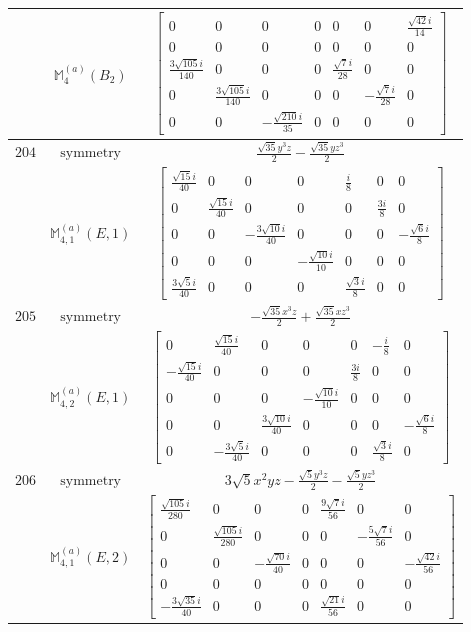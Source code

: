 \documentclass[fleqn,8pt,landscape]{jsarticle}
\begin{document}
\begin{longtable}{ccc}
$  $ & $ \mathbb{M}_{4}^{(a)}(B_{2}) $ & $ \begin{bmatrix} 0 & 0 & 0 & 0 & 0 & 0 & \frac{\sqrt{42} i}{14} \\ 0 & 0 & 0 & 0 & 0 & 0 & 0 \\ \frac{3 \sqrt{105} i}{140} & 0 & 0 & 0 & \frac{\sqrt{7} i}{28} & 0 & 0 \\ 0 & \frac{3 \sqrt{105} i}{140} & 0 & 0 & 0 & - \frac{\sqrt{7} i}{28} & 0 \\ 0 & 0 & - \frac{\sqrt{210} i}{35} & 0 & 0 & 0 & 0 \end{bmatrix} $ \\ \hline
$ 204 $ & $ \text{symmetry} $ & $ \frac{\sqrt{35} y^{3} z}{2} - \frac{\sqrt{35} y z^{3}}{2} $ \\
$  $ & $ \mathbb{M}_{4,1}^{(a)}(E,1) $ & $ \begin{bmatrix} \frac{\sqrt{15} i}{40} & 0 & 0 & 0 & \frac{i}{8} & 0 & 0 \\ 0 & \frac{\sqrt{15} i}{40} & 0 & 0 & 0 & \frac{3 i}{8} & 0 \\ 0 & 0 & - \frac{3 \sqrt{10} i}{40} & 0 & 0 & 0 & - \frac{\sqrt{6} i}{8} \\ 0 & 0 & 0 & - \frac{\sqrt{10} i}{10} & 0 & 0 & 0 \\ \frac{3 \sqrt{5} i}{40} & 0 & 0 & 0 & \frac{\sqrt{3} i}{8} & 0 & 0 \end{bmatrix} $ \\ \hline
$ 205 $ & $ \text{symmetry} $ & $ - \frac{\sqrt{35} x^{3} z}{2} + \frac{\sqrt{35} x z^{3}}{2} $ \\
$  $ & $ \mathbb{M}_{4,2}^{(a)}(E,1) $ & $ \begin{bmatrix} 0 & \frac{\sqrt{15} i}{40} & 0 & 0 & 0 & - \frac{i}{8} & 0 \\ - \frac{\sqrt{15} i}{40} & 0 & 0 & 0 & \frac{3 i}{8} & 0 & 0 \\ 0 & 0 & 0 & - \frac{\sqrt{10} i}{10} & 0 & 0 & 0 \\ 0 & 0 & \frac{3 \sqrt{10} i}{40} & 0 & 0 & 0 & - \frac{\sqrt{6} i}{8} \\ 0 & - \frac{3 \sqrt{5} i}{40} & 0 & 0 & 0 & \frac{\sqrt{3} i}{8} & 0 \end{bmatrix} $ \\ \hline
$ 206 $ & $ \text{symmetry} $ & $ 3 \sqrt{5} x^{2} y z - \frac{\sqrt{5} y^{3} z}{2} - \frac{\sqrt{5} y z^{3}}{2} $ \\
$  $ & $ \mathbb{M}_{4,1}^{(a)}(E,2) $ & $ \begin{bmatrix} \frac{\sqrt{105} i}{280} & 0 & 0 & 0 & \frac{9 \sqrt{7} i}{56} & 0 & 0 \\ 0 & \frac{\sqrt{105} i}{280} & 0 & 0 & 0 & - \frac{5 \sqrt{7} i}{56} & 0 \\ 0 & 0 & - \frac{\sqrt{70} i}{40} & 0 & 0 & 0 & - \frac{\sqrt{42} i}{56} \\ 0 & 0 & 0 & 0 & 0 & 0 & 0 \\ - \frac{3 \sqrt{35} i}{40} & 0 & 0 & 0 & \frac{\sqrt{21} i}{56} & 0 & 0 \end{bmatrix} $ \\ \hline

\end{longtable}
\end{document}
